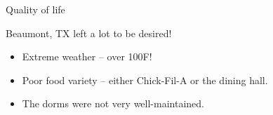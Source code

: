 \documentclass[8pt]{beamer}
\begin{document}
\begin{frame}{Quality of life}

Beaumont, TX left a lot to be desired!
\begin{itemize}
    \item Extreme weather -- over 100\textdegree{}F!
    \item Poor food variety -- either Chick-Fil-A or the dining hall.
    \item The dorms were not very well-maintained.
\end{itemize}

\begin{figure}
    \centering
    \textcolor{white}{} \hspace{0.5cm}
    \textcolor{white}{}
\end{figure}
    
\end{frame}
\end{document}
